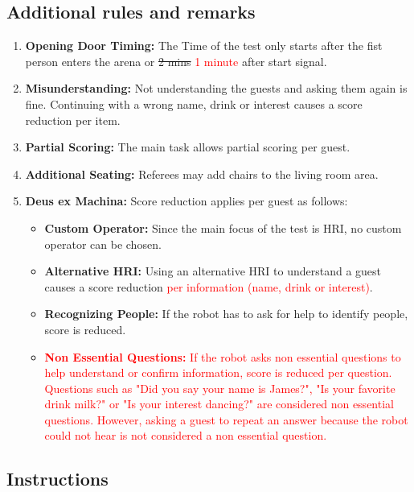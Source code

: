 \subsection*{Additional rules and remarks}
\begin{enumerate}[nosep]
	\item \textbf{Opening Door Timing:} The Time of the test only starts after the fist person enters the arena or \sout{2 mins} \textcolor{red}{1 minute} after start signal.

	\item \textbf{Misunderstanding:} Not understanding the guests and asking them again is fine. Continuing with a wrong name, drink or interest causes a score reduction per item.
		
	\item \textbf{Partial Scoring:} The main task allows partial scoring per guest.

	\item \textbf{Additional Seating:} Referees may add chairs to the living room area.
	
	\item \textbf{Deus ex Machina:} Score reduction applies per guest as follows:
	\begin{itemize}[nosep]
		\item \textbf{Custom Operator:} Since the main focus of the test is HRI, no custom operator can be chosen.
		\item \textbf{Alternative HRI:} Using an alternative HRI to understand a guest causes a score reduction \textcolor{red}{per information (name, drink or interest)}.
		\item \textbf{Recognizing People:} If the robot has to ask for help to identify people, score is reduced. 
		\item \textcolor{red}{\textbf{Non Essential Questions:} If the robot asks non essential questions to help understand or confirm information, score is reduced per question. 
		Questions such as "Did you say your name is James?", "Is your favorite drink milk?" or "Is your interest dancing?" are considered non essential questions. 
		However, asking a guest to repeat an answer because the robot could not hear is not considered a non essential question.}
	\end{itemize}
\end{enumerate}


\subsection*{Instructions}

